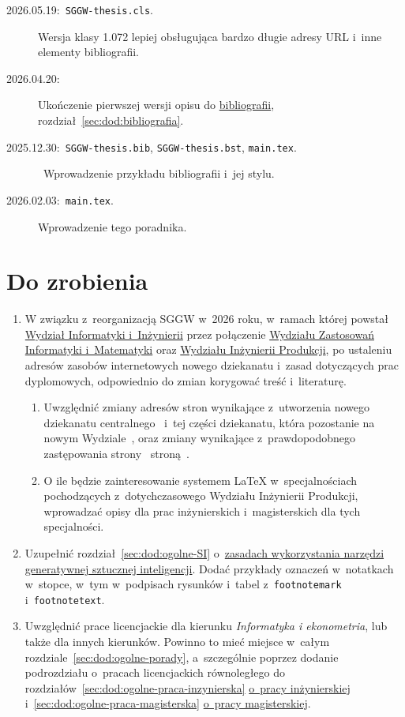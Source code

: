 \begin{description}
\item[\rm 2026.05.19:~{\tt SGGW-thesis.cls}.] Wersja klasy 1.072 lepiej obsługująca bardzo długie adresy URL i~inne elementy bibliografii.
\item[\rm 2026.04.20:] Ukończenie pierwszej wersji opisu do \hyperref[sec:dod:bibliografia]{bibliografii}, rozdział~\ref{sec:dod:bibliografia}.
\item[\rm 2025.12.30:~{\tt SGGW-thesis.bib}, {\tt SGGW-thesis.bst}, {\tt main.tex}.]~Wprowadzenie przykładu bibliografii i~jej stylu.
\item[\rm 2026.02.03:~{\tt main.tex}.] Wprowadzenie tego poradnika.
\end{description}


\section{Do zrobienia}
\label{sec:dod:todo}
\begin{enumerate}
  \item W związku z~reorganizacją SGGW w~2026 roku, w~ramach której powstał \href{https://wii.sggw.edu.pl}{Wydział Informatyki i~Inżynierii} przez połączenie \href{https://archiwumwzim.sggw.edu.pl/}{Wydziału Zastosowań Informatyki i~Matematyki} oraz \href{https://archiwumwip.sggw.edu.pl}{Wydziału Inżynierii Produkcji}, po ustaleniu adresów zasobów internetowych nowego dziekanatu i~zasad dotyczących prac dyplomowych, odpowiednio do zmian korygować treść i~literaturę.
  \begin{enumerate}
    \item Uwzględnić zmiany adresów stron wynikające z~utworzenia nowego dziekanatu centralnego~ i~tej części dziekanatu, która pozostanie na nowym Wydziale~, oraz zmiany wynikające z~prawdopodobnego zastępowania strony~ stroną~.
    \item O ile będzie zainteresowanie systemem \LaTeX{} w~specjalnościach pochodzących z~dotychczasowego Wydziału Inżynierii Produkcji, wprowadzać opisy dla prac inżynierskich i~magisterskich dla tych specjalności.
  \end{enumerate}
  \item Uzupełnić rozdział~\ref{sec:dod:ogolne-SI} o~\hyperref[sec:dod:ogolne-SI]{zasadach wykorzystania narzędzi generatywnej sztucznej inteligencji}. Dodać przykłady oznaczeń w~notatkach w~stopce, w~tym w~podpisach rysunków i~tabel z~{\tt footnotemark} i~{\tt footnotetext}.
  \item Uwzględnić prace licencjackie dla kierunku {\em Informatyka i ekonometria}, lub także dla innych kierunków. Powinno to mieć miejsce w~całym rozdziale~\ref{sec:dod:ogolne-porady}, a~szczególnie poprzez dodanie podrozdziału o~pracach licencjackich równoległego do rozdziałów~\ref{sec:dod:ogolne-praca-inzynierska} \hyperref[sec:dod:ogolne-praca-inzynierska]{o~pracy inżynierskiej} i~\ref{sec:dod:ogolne-praca-magisterska} \hyperref[sec:dod:ogolne-praca-magisterska]{o~pracy magisterskiej}.
\end{enumerate}


